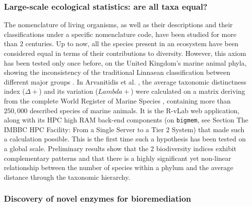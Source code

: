    \subsubsection*{Large-scale ecological statistics: are all taxa equal?}

   The nomenclature of living organisms, as well as their descriptions and their classifications under a specific nomenclature code, have been studied for more than $2$ centuries. 
   Up to now, all the species present in an ecosystem have been considered equal in terms of their contributions to diversity. 
   However, this axiom has been tested only once before, on the United Kingdom's marine animal phyla, showing the inconsistency of the traditional Linnaean classification between different major groups \citep{warwick2008all}. 
   In Arvanitidis et al. \citep{arvanitidis2018research}, the average taxonomic distinctness index 
   ($\Delta+$) and its variation ($Lambda+$) were calculated on a matrix deriving from the complete World Register of Marine Species \citep{vandepitte2018decade}, containing more than $250,000$ described species of marine animals. 
   It is the R-vLab web application, along with its HPC high RAM back-end components (on \texttt{bigmem}, see Section The IMBBC HPC Facility: 
   From a Single Server to a Tier 2 System) that made such a calculation possible. This is the first time such a hypothesis has been tested on a global scale. 
   Preliminary results show that the 2 biodiversity indices exhibit complementary patterns and that there is a highly significant yet non-linear relationship between the number of species within a phylum and the average distance through the taxonomic hierarchy.

   \subsubsection*{Discovery of novel enzymes for bioremediation}

